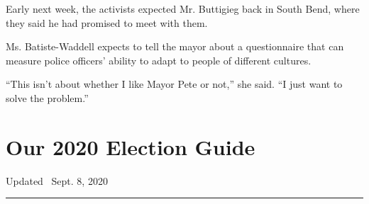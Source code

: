 Early next week, the activists expected Mr. Buttigieg back in South
Bend, where they said he had promised to meet with them.

Ms. Batiste-Waddell expects to tell the mayor about a questionnaire that
can measure police officers' ability to adapt to people of different
cultures.

``This isn't about whether I like Mayor Pete or not,'' she said. ``I
just want to solve the problem.''

\hypertarget{our-2020-election-guide}{%
\section{Our 2020 Election Guide}\label{our-2020-election-guide}}

Updated ~Sept. 8, 2020

\begin{center}\rule{0.5\linewidth}{\linethickness}\end{center}

